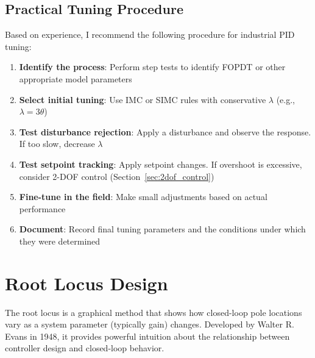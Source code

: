 \subsection{Practical Tuning Procedure}
\label{subsec:practical_tuning}

Based on experience, I recommend the following procedure for industrial PID tuning:

\begin{enumerate}
    \item \textbf{Identify the process}: Perform step tests to identify FOPDT or other appropriate model parameters

    \item \textbf{Select initial tuning}: Use IMC or SIMC rules with conservative $\lambda$ (e.g., $\lambda = 3\theta$)

    \item \textbf{Test disturbance rejection}: Apply a disturbance and observe the response. If too slow, decrease $\lambda$

    \item \textbf{Test setpoint tracking}: Apply setpoint changes. If overshoot is excessive, consider 2-DOF control (Section~\ref{sec:2dof_control})

    \item \textbf{Fine-tune in the field}: Make small adjustments based on actual performance

    \item \textbf{Document}: Record final tuning parameters and the conditions under which they were determined
\end{enumerate}


\section{Root Locus Design}
\label{sec:root_locus}

The root locus is a graphical method that shows how closed-loop pole locations vary as a system parameter (typically gain) changes. Developed by Walter R. Evans in 1948, it provides powerful intuition about the relationship between controller design and closed-loop behavior.

